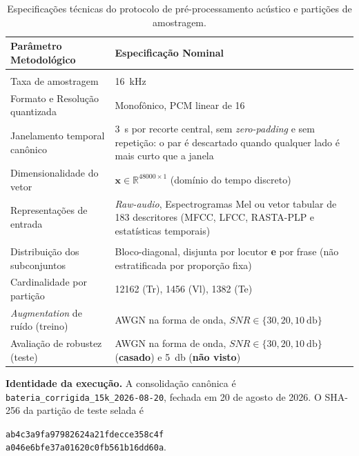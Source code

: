 \documentclass[12pt,a4paper]{article}
\begin{document}
\begin{table}[H]
	\centering
	\caption{Especificações técnicas do protocolo de pré-processamento acústico e partições de amostragem.}
	\label{tab:prep_part}
	\small
	\begin{tabular}{@{}>{\raggedright\arraybackslash}p{5.2cm}
			>{\raggedright\arraybackslash}p{9.5cm}@{}}
		\toprule
		\textbf{Parâmetro Metodológico} & \textbf{Especificação Nominal} \\
		\midrule
		\multicolumn{2}{c}{\textbf{Pré-processamento Acústico}} \\
		\midrule
		Taxa de amostragem & \SI{16}{\kilo\hertz} \\
		Formato e Resolução quantizada & Monofônico, PCM linear de \SI{16}{\bit} \\
		Janelamento temporal canônico & \SI{3}{\second} por recorte central, sem \textit{zero-padding} e sem repetição: o par é descartado quando qualquer lado é mais curto que a janela \\
		Dimensionalidade do vetor & $\mathbf{x} \in \mathbb{R}^{\num{48000} \times 1}$ (domínio do tempo discreto) \\
		Representações de entrada & \textit{Raw-audio}, Espectrogramas Mel ou vetor tabular de \num{183} descritores (MFCC, LFCC, RASTA-PLP e estatísticas temporais) \\
		\midrule
		\multicolumn{2}{c}{\textbf{Particionamento por Disjunção Dupla}} \\
		\midrule
		Distribuição dos subconjuntos & Bloco-diagonal, disjunta por locutor \textbf{e} por frase (não estratificada por proporção fixa) \\
		Cardinalidade por partição & \num[group-minimum-digits=4]{12162} (Tr), \num[group-minimum-digits=4]{1456} (Vl), \num[group-minimum-digits=4]{1382} (Te) \\
		\textit{Augmentation} de ruído (treino) & AWGN na forma de onda, $SNR \in \{\num{30}, \num{20}, \SI{10}{\decibel}\}$ \\
		Avaliação de robustez (teste) & AWGN na forma de onda, $SNR \in \{\num{30}, \num{20}, \SI{10}{\decibel}\}$ (\textbf{casado}) e \SI{5}{\decibel} (\textbf{não visto}) \\
		\bottomrule
	\end{tabular}
\end{table}

\noindent\textbf{Identidade da execução.} A consolidação canônica é
\texttt{bateria\_corrigida\_15k\_2026-08-20}, fechada em 20 de agosto de 2026.
O SHA-256 da partição de teste selada é
\par\noindent\texttt{ab4c3a9fa97982624a21fdecce358c4f}\\
\texttt{a046e6bfe37a01620c0fb561b16dd60a}.
\end{document}
